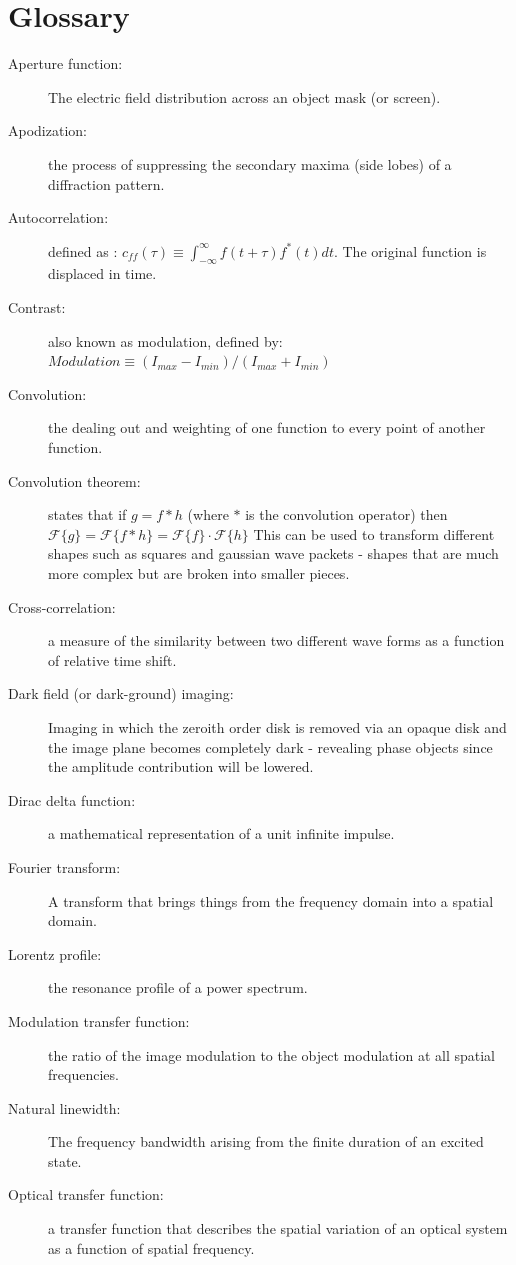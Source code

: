 \documentclass[12pt]{report}
\begin{document}
\section{Glossary}
\begin{description}
\item[Aperture function: ] The electric field distribution across an object mask (or screen). 
\item[Apodization: ] the process of suppressing the secondary maxima (side lobes) of a diffraction pattern. 
\item[Autocorrelation: ] defined as : $c_{ff}(\tau) \equiv \int_{-\infty}^\infty f(t+\tau)f^*(t)dt$. The original function is displaced in time. 
\item[Contrast: ] also known as modulation, defined by: $Modulation \equiv (I_{max} - I_{min})/(I_{max} + I_{min})$
\item[Convolution: ] the dealing out and weighting of one function to every point of another function. 
\item[Convolution theorem: ] states that if $g = f * h$ (where $*$ is the convolution operator) then $\mathcal{F}\{g\} = \mathcal{F}\{f*h\} = \mathcal{F} \{f\} \cdot \mathcal{F}\{h\} $ This can be used to transform different shapes such as squares and gaussian wave packets - shapes that are much more complex but are broken into smaller pieces. 
\item[Cross-correlation: ] a measure of the similarity between two different wave forms as a function of relative time shift. 
\item[Dark field (or dark-ground) imaging: ] Imaging in which the zeroith order disk is removed via an opaque disk and the image plane becomes completely dark - revealing phase objects since the amplitude contribution will be lowered. 
\item[Dirac delta function: ] a mathematical representation of a unit infinite impulse. 
\item[Fourier transform: ] A transform that brings things from the frequency domain into a spatial domain. 
\item[Lorentz profile: ] the resonance profile of a power spectrum. 
\item[Modulation transfer function: ] the ratio of the image modulation to the object modulation at all spatial frequencies. 
\item[Natural linewidth: ] The frequency bandwidth arising from the finite duration of an excited state. 
\item[Optical transfer function: ] a transfer function that describes the spatial variation of an optical system as a function of spatial frequency. 

\end{description}
\end{document}
